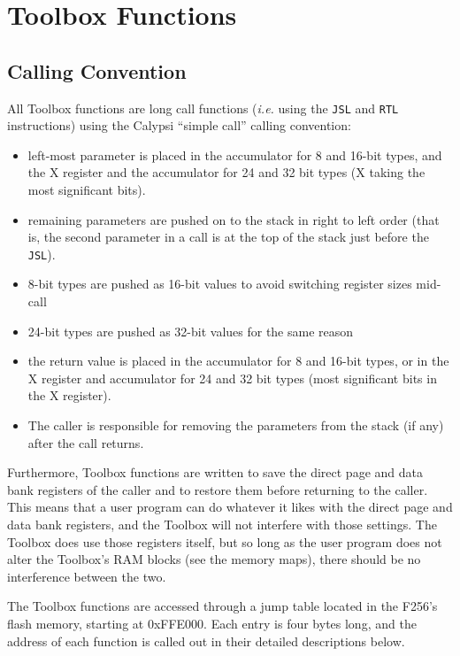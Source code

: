 \chapter{Toolbox Functions}

\section{Calling Convention}

All Toolbox functions are long call functions ({\it i.e.} using the \verb+JSL+ and \verb+RTL+ instructions) using the Calypsi ``simple call'' calling convention:
\begin{itemize}
	\item left-most parameter is placed in the accumulator for 8 and 16-bit types, and the X register and the accumulator for 24 and 32 bit types (X taking the most significant bits).
	\item remaining parameters are pushed on to the stack in right to left order (that is, the second parameter in a call is at the top of the stack just before the \verb+JSL+).
	\item 8-bit types are pushed as 16-bit values to avoid switching register sizes mid-call
	\item 24-bit types are pushed as 32-bit values for the same reason
	\item the return value is placed in the accumulator for 8 and 16-bit types, or in the X register and accumulator for 24 and 32 bit types (most significant bits in the X register).
	\item The caller is responsible for removing the parameters from the stack (if any) after the call returns.
\end{itemize}

Furthermore, Toolbox functions are written to save the direct page and data bank registers of the caller and to restore them before returning to the caller.
This means that a user program can do whatever it likes with the direct page and data bank registers,
and the Toolbox will not interfere with those settings. The Toolbox does use those registers itself,
but so long as the user program does not alter the Toolbox's RAM blocks (see the memory maps), there should be no interference between the two.

The Toolbox functions are accessed through a jump table located in the F256's flash memory, starting at 0xFFE000.
Each entry is four bytes long, and the address of each function is called out in their detailed descriptions below.

